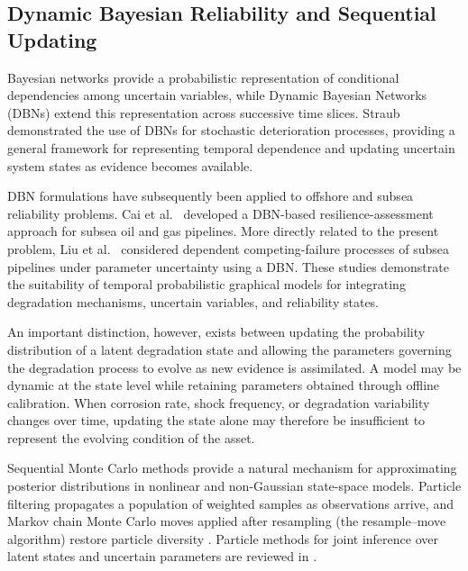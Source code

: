 \documentclass[journal]{IEEEtran}
\begin{document}

\subsection{Dynamic Bayesian Reliability and Sequential Updating}
\label{sec:lit_dbn}

Bayesian networks provide a probabilistic representation of conditional
dependencies among uncertain variables, while Dynamic Bayesian Networks
(DBNs) extend this representation across successive time slices.
Straub~\cite{straub2009} demonstrated the use of DBNs for stochastic
deterioration processes, providing a general framework for representing
temporal dependence and updating uncertain system states as evidence
becomes available.

DBN formulations have subsequently been applied to offshore and subsea
reliability problems. Cai et al.~\cite{cai2020resil} developed a
DBN-based resilience-assessment approach for subsea oil and gas
pipelines. More directly related to the present problem, Liu
et al.~\cite{liu2023} considered dependent competing-failure processes
of subsea pipelines under parameter uncertainty using a DBN. These
studies demonstrate the suitability of temporal probabilistic graphical
models for integrating degradation mechanisms, uncertain variables, and
reliability states.

An important distinction, however, exists between updating the
probability distribution of a latent degradation state and allowing the
parameters governing the degradation process to evolve as new evidence
is assimilated. A model may be dynamic at the state level while retaining
parameters obtained through offline calibration. When corrosion rate,
shock frequency, or degradation variability changes over time, updating
the state alone may therefore be insufficient to represent the evolving
condition of the asset.

Sequential Monte Carlo methods provide a natural mechanism for
approximating posterior distributions in nonlinear and non-Gaussian
state-space models. Particle filtering propagates a population of
weighted samples as observations arrive, and Markov chain Monte Carlo
moves applied after resampling (the resample--move algorithm) restore
particle diversity \cite{gilks2001}. Particle methods for joint
inference over latent states and uncertain parameters are reviewed
in \cite{kantas2015}.
\end{document}
